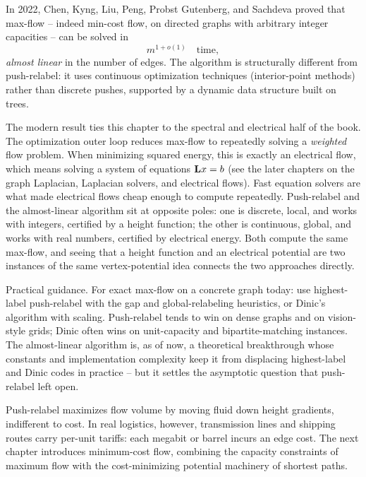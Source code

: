 In 2022, Chen, Kyng, Liu, Peng, Probst Gutenberg, and Sachdeva proved that max-flow -- indeed min-cost flow, on directed graphs with arbitrary integer capacities -- can be solved in
\[
  m^{1+o(1)}\quad\text{time},
\]
\emph{almost linear} in the number of edges. The algorithm is structurally different from push-relabel: it uses continuous optimization techniques (interior-point methods) rather than discrete pushes, supported by a dynamic data structure built on trees.

\begin{connectionbox}
The modern result ties this chapter to the spectral and electrical half of the book. The optimization outer loop reduces max-flow to repeatedly solving a \emph{weighted} flow problem. When minimizing squared energy, this is exactly an electrical flow, which means solving a system of equations $\mathbf{L} x = b$ (see the later chapters on the graph Laplacian, Laplacian solvers, and electrical flows). Fast equation solvers are what made electrical flows cheap enough to compute repeatedly. Push-relabel and the almost-linear algorithm sit at opposite poles: one is discrete, local, and works with integers, certified by a height function; the other is continuous, global, and works with real numbers, certified by electrical energy. Both compute the same max-flow, and seeing that a height function and an electrical potential are two instances of the same vertex-potential idea connects the two approaches directly.
\end{connectionbox}

\begin{focusbox}
Practical guidance. For exact max-flow on a concrete graph today: use highest-label push-relabel with the gap and global-relabeling heuristics, or Dinic's algorithm with scaling. Push-relabel tends to win on dense graphs and on vision-style grids; Dinic often wins on unit-capacity and bipartite-matching instances. The almost-linear algorithm is, as of now, a theoretical breakthrough whose constants and implementation complexity keep it from displacing highest-label and Dinic codes in practice -- but it settles the asymptotic question that push-relabel left open.
\end{focusbox}

Push-relabel maximizes flow volume by moving fluid down height gradients, indifferent to cost.
In real logistics, however, transmission lines and shipping routes carry per-unit tariffs: each megabit or barrel incurs an edge cost.
The next chapter introduces minimum-cost flow, combining the capacity constraints of maximum flow with the cost-minimizing potential machinery of shortest paths.

